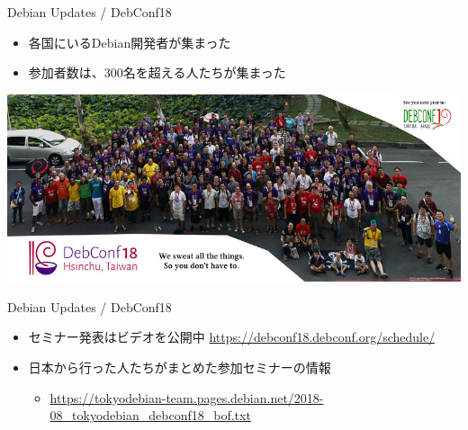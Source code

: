 \begin{frame}{Debian Updates / DebConf18}%

\begin{itemize}
\item 各国にいるDebian開発者が集まった
\item 参加者数は、300名を超える人たちが集まった
\end{itemize}

\includegraphics[scale=0.4,bb=0 0 800 331]{image201810/800px-Debconf18_group_photo.jpg}

\end{frame}


\begin{frame}{Debian Updates / DebConf18}%

\begin{itemize}
\item セミナー発表はビデオを公開中 \url{https://debconf18.debconf.org/schedule/}
\item 日本から行った人たちがまとめた参加セミナーの情報
  \begin{itemize}
    \item \url{https://tokyodebian-team.pages.debian.net/2018-08_tokyodebian_debconf18_bof.txt}
  \end{itemize}
\end{itemize}


\end{frame}

